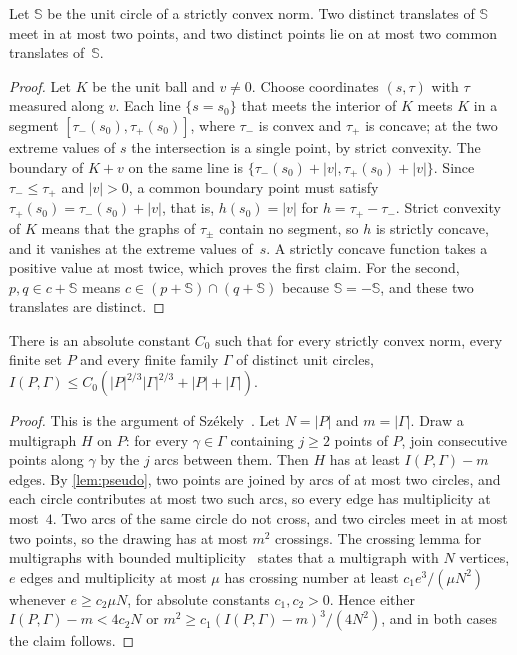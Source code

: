 \documentclass[anonymous,a4paper,USenglish,cleveref,autoref,thm-restate]{socg-lipics-v2021}
\begin{document}
\begin{lemma}
\label{lem:pseudo}
Let $\mathbb S$ be the unit circle of a strictly convex norm. Two distinct translates of $\mathbb S$ meet in at most two points, and two distinct points lie on at most two common translates of~$\mathbb S$.
\end{lemma}

\begin{proof}
Let $K$ be the unit ball and $v\ne0$. Choose coordinates $(s,\tau)$ with $\tau$ measured along $v$. Each line $\{s=s_0\}$ that meets the interior of $K$ meets $K$ in a segment $[\tau_-(s_0),\tau_+(s_0)]$, where $\tau_-$ is convex and $\tau_+$ is concave; at the two extreme values of $s$ the intersection is a single point, by strict convexity. The boundary of $K+v$ on the same line is $\{\tau_-(s_0)+|v|,\tau_+(s_0)+|v|\}$. Since $\tau_-\le\tau_+$ and $|v|>0$, a common boundary point must satisfy $\tau_+(s_0)=\tau_-(s_0)+|v|$, that is, $h(s_0)=|v|$ for $h=\tau_+-\tau_-$. Strict convexity of $K$ means that the graphs of $\tau_\pm$ contain no segment, so $h$ is strictly concave, and it vanishes at the extreme values of~$s$. A strictly concave function takes a positive value at most twice, which proves the first claim. For the second, $p,q\in c+\mathbb S$ means $c\in(p+\mathbb S)\cap(q+\mathbb S)$ because $\mathbb S=-\mathbb S$, and these two translates are distinct.
\end{proof}

\begin{lemma}
\label{lem:incidence}
There is an absolute constant $C_0$ such that for every strictly convex norm, every finite set $P$ and every finite family $\Gamma$ of distinct unit circles, $I(P,\Gamma)\le C_0(|P|^{2/3}|\Gamma|^{2/3}+|P|+|\Gamma|)$.
\end{lemma}

\begin{proof}
This is the argument of Sz\'ekely~\cite{Szekely97}. Let $N=|P|$ and $m=|\Gamma|$. Draw a multigraph $H$ on $P$: for every $\gamma\in\Gamma$ containing $j\ge2$ points of $P$, join consecutive points along $\gamma$ by the $j$ arcs between them. Then $H$ has at least $I(P,\Gamma)-m$ edges. By \cref{lem:pseudo}, two points are joined by arcs of at most two circles, and each circle contributes at most two such arcs, so every edge has multiplicity at most~$4$. Two arcs of the same circle do not cross, and two circles meet in at most two points, so the drawing has at most $m^2$ crossings. The crossing lemma for multigraphs with bounded multiplicity~\cite{Szekely97} states that a multigraph with $N$ vertices, $e$ edges and multiplicity at most $\mu$ has crossing number at least $c_1e^3/(\mu N^2)$ whenever $e\ge c_2\mu N$, for absolute constants $c_1,c_2>0$. Hence either $I(P,\Gamma)-m<4c_2N$ or $m^2\ge c_1(I(P,\Gamma)-m)^3/(4N^2)$, and in both cases the claim follows.
\end{proof}
\end{document}
